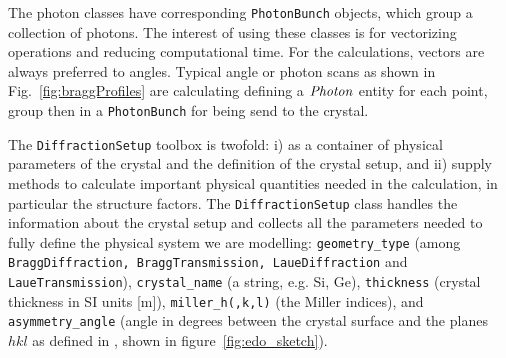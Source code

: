 \documentclass[preprint]{iucr}              %
\begin{document}
The photon classes 
have corresponding {\tt PhotonBunch} objects, which group a collection of photons. The interest of using these classes is for vectorizing operations and reducing computational time. For the calculations, vectors are always preferred to angles. Typical angle or photon scans as shown in Fig.~\ref{fig:braggProfiles} are calculating defining a $\tt Photon$ entity for each point, group then in a {\tt PhotonBunch} for being send to the crystal. 


The {\tt DiffractionSetup} toolbox is twofold: i) as a container of physical parameters of the crystal and the definition of the crystal setup, and ii) supply methods to calculate important physical quantities needed in the calculation, in particular the structure factors. The {\tt DiffractionSetup} class handles the information about the crystal setup and collects all the parameters needed to fully define the physical system we are modelling:
{\tt geometry\_type} (among {\tt BraggDiffraction, BraggTransmission, LaueDiffraction} and {\tt LaueTransmission}),
{\tt crystal\_name} (a string, e.g. Si, Ge),
{\tt thickness} (crystal thickness in SI units [m]),
{\tt miller\_h(,k,l)} (the Miller indices),
 and {\tt asymmetry\_angle} (angle in degrees between the crystal surface and the planes $hkl$ as defined in \cite{codeCRYSTAL}, shown in figure~\ref{fig:edo_sketch}).


 
\end{document}
